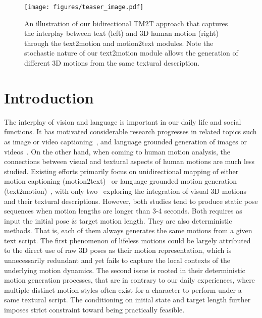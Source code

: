 \documentclass[runningheads]{llncs}
\newcommand{\beforefigcaption}{\vspace{-9mm}}
\newcommand{\afterfigcaption}{\vspace{-5mm}}
\newcommand{\beforesection}{\vspace{-2mm}}
\newcommand{\aftersection}{\vspace{-2mm}}
\begin{document}
\begin{figure*}[t]
	\centering
	\texttt{[image: figures/teaser\_image.pdf]}
		 \beforefigcaption
	\caption{An illustration of our bidirectional TM2T approach that captures the interplay between text (left) and 3D human motion (right) through the text2motion and motion2text modules. Note the stochastic nature of our text2motion module allows the generation of different 3D motions from the same textural description. }
	\label{fig:teaser_image}
	 \afterfigcaption
\end{figure*}

\beforesection
\section{Introduction}
\aftersection

The interplay of vision and language is important in our daily life and social functions. It has motivated considerable research progresses in related topics such as image or video captioning~\cite{xu2015show,vinyals2015show}, and language grounded generation of images or videos~\cite{zhang2017stackgan,xu2018attngan,li2018video}. On the other hand, when coming to human motion analysis, the connections between visual and textural aspects of human motions are much less studied. 
Existing efforts primarily focus on unidirectional mapping of either motion captioning (motion2text)~\cite{goutsu2021linguistic,takano2015statistical} or language grounded motion generation (text2motion)~\cite{ahuja2019language2pose,ghosh2021synthesis,lin2018generating}, with only two~\cite{plappert2018learning,yamada2018paired} exploring the integration of visual 3D motions and their textural descriptions. However, both studies tend to produce static pose sequences when motion lengths are longer than 3-4 seconds. Both requires as input the initial pose \& target motion length. They are also deterministic methods. That is, each of them always generates the same motions from a given text script. 
The first phenomenon of lifeless motions could be largely attributed to the direct use of raw 3D poses as their motion representation, which is unnecessarily redundant and yet fails to capture the local contexts of the underlying motion dynamics. The second issue is rooted in their deterministic motion generation processes, that are in contrary to our daily experiences, where multiple distinct motion styles often exist for a character to perform under a same textural script. The conditioning on initial state and target length further imposes strict constraint toward being practically feasible.
\end{document}
